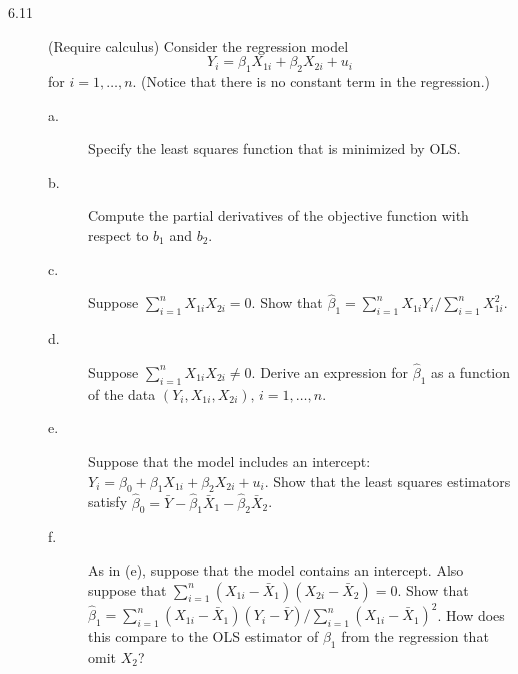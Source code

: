\documentclass[a4paper,11pt]{article}
\begin{document}
\begin{description}
\item[{6.11}] (Require calculus) Consider the regression model
\[ Y_i = \beta_1 X_{1i} + \beta_2 X_{2i} + u_i \]
for \(i=1,\ldots,n\). (Notice that there is no constant term
in the regression.)
\begin{description}
\item[{a.}] Specify the least squares function that is minimized by OLS.
\item[{b.}] Compute the partial derivatives of the objective function
with respect to \(b_1\) and \(b_2\).
\item[{c.}] Suppose \(\sum_{i=1}^n X_{1i}X_{2i} = 0\). Show that
\(\hat{\beta}_1 = \sum_{i=1}^n X_{1i}Y_i/\sum_{i=1}^n
          X_{1i}^2\).
\item[{d.}] Suppose \(\sum_{i=1}^n X_{1i}X_{2i} \neq 0\). Derive an
expression for \(\hat{\beta}_1\) as a function of the data
\((Y_i, X_{1i}, X_{2i}),\, i=1,\ldots, n\).
\item[{e.}] Suppose that the model includes an intercept:
\(Y_i = \beta_0 + \beta_1 X_{1i} + \beta_2 X_{2i} +
          u_i\). Show that the least squares estimators satisfy
\(\hat{\beta}_0 = \bar{Y} - \hat{\beta}_1 \bar{X}_1 -
          \hat{\beta}_2 \bar{X}_2\).
\item[{f.}] As in (e), suppose that the model contains an
intercept. Also suppose that \(\sum_{i=1}^n (X_{1i} -
          \bar{X}_1)(X_{2i} - \bar{X}_2) = 0\). Show that
\(\hat{\beta}_1 = \sum_{i=1}^n (X_{1i} - \bar{X}_1)(Y_i -
          \bar{Y})/\sum_{i=1}^n (X_{1i} - \bar{X}_1)^2\). How does this
compare to the OLS estimator of \(\beta_1\) from the
regression that omit \(X_2\)?
\end{description}
\end{description}
\end{document}
